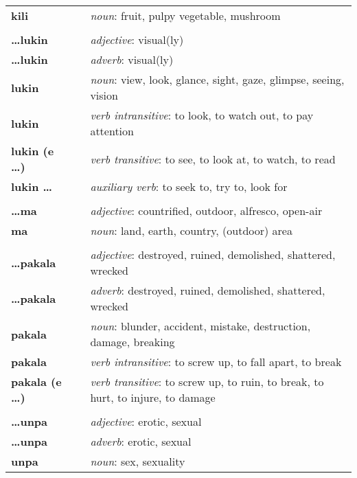 \begin{supertabular}{p{2,5cm}|ll}
\textbf{kili} && \textit{noun}: fruit, pulpy vegetable, mushroom \\ %
 && \\ %
%
\textbf{\dots lukin} && \textit{adjective}: visual(ly) \\ %
\textbf{\dots lukin} && \textit{adverb}: visual(ly) \\ %
\textbf{lukin} && \textit{noun}: view, look, glance, sight, gaze, glimpse, seeing, vision \\ %
\textbf{lukin} && \textit{verb intransitive}: to look, to watch out, to pay attention \\ %
\textbf{lukin (e \dots)} && \textit{verb transitive}: to see, to look at, to watch, to read \\ %
\textbf{lukin \dots} && \textit{auxiliary verb}: to seek to, try to, look for \\ %
 && \\ %
%
\textbf{\dots ma} && \textit{adjective}: countrified, outdoor, alfresco, open-air \\ %
\textbf{ma} && \textit{noun}: land, earth, country, (outdoor) area \\ %
 && \\ %
%
\textbf{\dots pakala} && \textit{adjective}: destroyed, ruined, demolished, shattered, wrecked \\ %
\textbf{\dots pakala} && \textit{adverb}: destroyed, ruined, demolished, shattered, wrecked \\ %
\textbf{pakala} && \textit{noun}: blunder, accident, mistake, destruction, damage, breaking \\ %
\textbf{pakala} && \textit{verb intransitive}: to screw up, to fall apart, to break \\ %
\textbf{pakala (e \dots)} && \textit{verb transitive}: to screw up, to ruin, to break, to hurt, to injure, to damage \\ %
 && \\ %
%
\textbf{\dots unpa} && \textit{adjective}: erotic, sexual \\ %
\textbf{\dots unpa} && \textit{adverb}: erotic, sexual \\ %
\textbf{unpa} && \textit{noun}: sex, sexuality \\ %

\end{supertabular}
